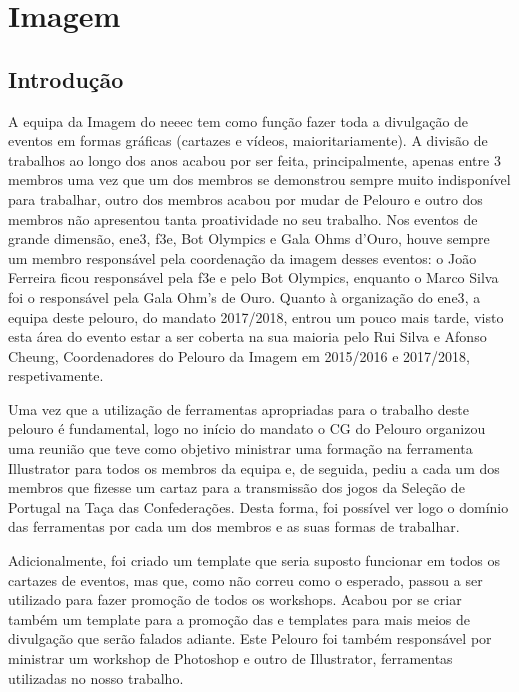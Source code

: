 
\section{Imagem}

\subsection{Introdução}

A equipa da Imagem do \acrshort{neeec} tem como função fazer toda a divulgação de eventos em formas gráficas (cartazes e vídeos, maioritariamente). A divisão de trabalhos ao longo dos anos acabou por ser feita, principalmente, apenas entre 3 membros uma vez que um dos membros se demonstrou sempre muito indisponível para trabalhar, outro dos membros acabou por mudar de Pelouro e outro dos membros não apresentou tanta proatividade no seu trabalho. Nos eventos de grande dimensão, \acrshort{ene3}, \acrshort{f3e}, Bot Olympics e Gala Ohms d'Ouro, houve sempre um membro responsável pela coordenação da imagem desses eventos: o João Ferreira ficou responsável pela \acrshort{f3e} e pelo Bot Olympics, enquanto o Marco Silva foi o responsável pela Gala Ohm’s de Ouro. Quanto à organização do \acrshort{ene3}, a equipa deste pelouro, do mandato 2017/2018, entrou um pouco mais tarde, visto esta área do evento estar a ser coberta na sua maioria pelo Rui Silva e Afonso Cheung, Coordenadores do Pelouro da Imagem em 2015/2016 e 2017/2018, respetivamente.

Uma vez que a utilização de ferramentas apropriadas para o trabalho deste pelouro é fundamental, logo no início do mandato o CG do Pelouro organizou uma reunião que teve como objetivo ministrar uma formação na ferramenta Illustrator para todos os membros da equipa e, de seguida, pediu a cada um dos membros que fizesse um cartaz para a transmissão dos jogos da Seleção de Portugal na Taça das Confederações. Desta forma, foi possível ver logo o domínio das ferramentas por cada um dos membros e as suas formas de trabalhar.

Adicionalmente, foi criado um template que seria suposto funcionar em todos os cartazes de eventos, mas que, como não correu como o esperado, passou a ser utilizado para fazer promoção de todos os workshops. Acabou por se criar também um template para a promoção das  e templates para mais meios de divulgação que serão falados adiante. Este Pelouro foi também responsável por ministrar um workshop de Photoshop e outro de Illustrator, ferramentas utilizadas no nosso trabalho.

